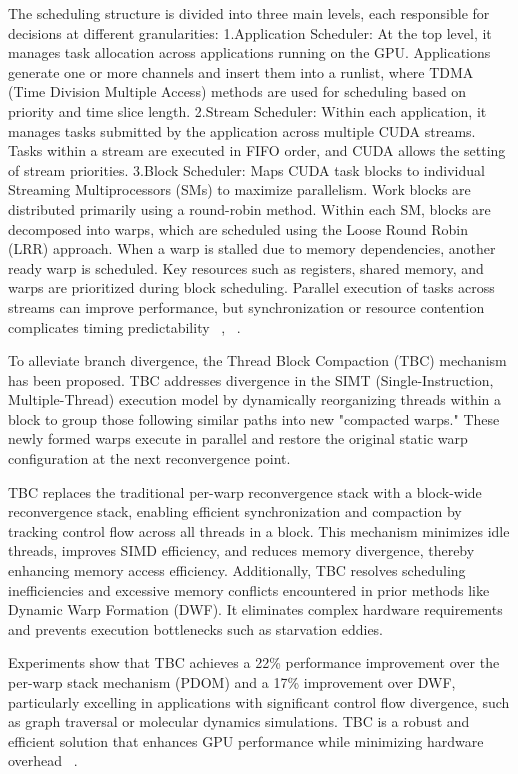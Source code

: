 \documentclass[conference]{IEEEtran}
\begin{document}
The scheduling structure is divided into three main levels, each responsible for decisions at different granularities:
  1.Application Scheduler: At the top level, it manages task allocation across applications running on the GPU. Applications generate one or more channels and insert them into a runlist, where TDMA (Time Division Multiple Access) methods are used for scheduling based on priority and time slice length.
  2.Stream Scheduler: Within each application, it manages tasks submitted by the application across multiple CUDA streams. Tasks within a stream are executed in FIFO order, and CUDA allows the setting of stream priorities.
  3.Block Scheduler: Maps CUDA task blocks to individual Streaming Multiprocessors (SMs) to maximize parallelism. Work blocks are distributed primarily using a round-robin method. Within each SM, blocks are decomposed into warps, which are scheduled using the Loose Round Robin (LRR) approach. When a warp is stalled due to memory dependencies, another ready warp is scheduled. Key resources such as registers, shared memory, and warps are prioritized during block scheduling.
Parallel execution of tasks across streams can improve performance, but synchronization or resource contention complicates timing predictability ~\cite{Bakhoda2009}, ~\cite{Sanudo2020}.

To alleviate branch divergence, the Thread Block Compaction (TBC) mechanism has been proposed. TBC addresses divergence in the SIMT (Single-Instruction, Multiple-Thread) execution model by dynamically reorganizing threads within a block to group those following similar paths into new "compacted warps." These newly formed warps execute in parallel and restore the original static warp configuration at the next reconvergence point.

TBC replaces the traditional per-warp reconvergence stack with a block-wide reconvergence stack, enabling efficient synchronization and compaction by tracking control flow across all threads in a block. This mechanism minimizes idle threads, improves SIMD efficiency, and reduces memory divergence, thereby enhancing memory access efficiency. Additionally, TBC resolves scheduling inefficiencies and excessive memory conflicts encountered in prior methods like Dynamic Warp Formation (DWF). It eliminates complex hardware requirements and prevents execution bottlenecks such as starvation eddies.

Experiments show that TBC achieves a 22\% performance improvement over the per-warp stack mechanism (PDOM) and a 17\% improvement over DWF, particularly excelling in applications with significant control flow divergence, such as graph traversal or molecular dynamics simulations. TBC is a robust and efficient solution that enhances GPU performance while minimizing hardware overhead ~\cite{Fung2011HPC}.
\end{document}
